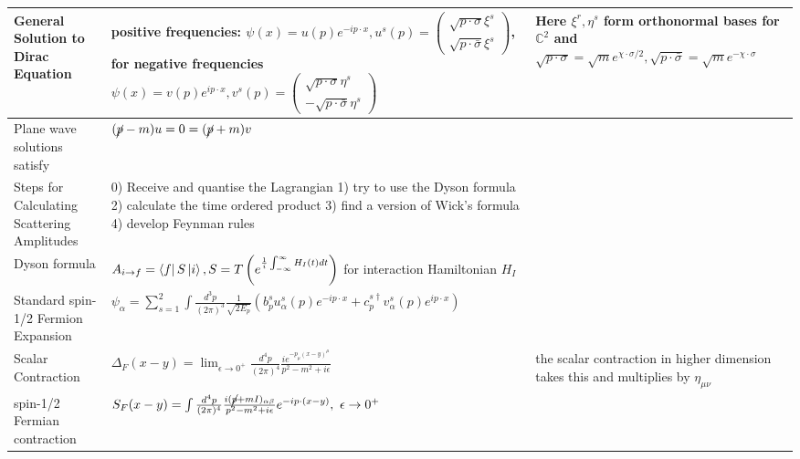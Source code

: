 \documentclass{article}
\theoremstyle{definition}
\begin{document}
\begin{table}[H]
\begin{adjustbox}{center}
\begin{tabular}{|p{5cm}|p{10cm}|p{5cm}|}
      General Solution to Dirac Equation &
      positive frequencies: $\psi(x) = u(p) e^{-i p \cdot x}, u^s(p) = \begin{pmatrix} \sqrt{p \cdot \sigma} \xi^s \\ \sqrt{p \cdot \bar{\sigma}} \xi^s \end{pmatrix}$,
      for negative frequencies $\psi(x) = v(p) e^{ip \cdot x}, v^s(p) = \begin{pmatrix} \sqrt{p \cdot \sigma} \eta^s \\ -\sqrt{p \cdot \bar{\sigma}} \eta^s \end{pmatrix}$ &
      Here $\xi^r, \eta^s$ form orthonormal bases for $\mathbb{C}^2$ and
      $\sqrt{p \cdot \sigma} = \sqrt{m} e^{\chi \cdot \sigma / 2}, \sqrt{p \cdot \bar{\sigma}} = \sqrt{m} e^{-\chi \cdot \sigma}$ \\ \hline
      Plane wave solutions satisfy & $(\cancel{p} - m)u = 0 = (\cancel{p} + m)v$ & \\ \hline
      Steps for Calculating Scattering Amplitudes & 0) Receive and quantise the Lagrangian 1) try to use the Dyson formula 2) calculate the time ordered product 3) find a version of Wick's formula 4) develop Feynman rules & \\ \hline
      Dyson formula & $A_{i \to f} = \bra{f} S \ket{i}, S = T\left( e^{\frac{1}{i} \int_{-\infty}^\infty H_I(t) dt} \right)$ for interaction Hamiltonian $H_I$ & \\ \hline
      Standard spin-1/2 Fermion Expansion & $\psi_\alpha = \sum_{s = 1}^2 \int \frac{d^3p}{(2\pi)^3}
                                            \frac{1}{\sqrt{2 E_p}} \left( b_p^s u_\alpha^s(p) e^{-ip \cdot x} +
                                            c_p^{s \dagger} v_\alpha^s(p) e^{ip \cdot x} \right)$ & \\ \hline
      Scalar Contraction & $ \Delta_F(x - y) = \lim_{\epsilon \to 0^+}
                           \frac{d^4p}{(2\pi)^4} \frac{i e^{-p_\mu (x - y)^\mu}}{p^2 - m^2 + i\epsilon}$
                                  & the scalar contraction in higher dimension takes this and multiplies
                                    by $\eta_{\mu \nu}$ \\ \hline
      spin-1/2 Fermian contraction & $S_F(x - y) = \int \frac{d^4p}{(2\pi)^4} \frac{i(\cancel{p} + mI)_{\alpha \beta}}{p^2 - m^2
  + i \epsilon} e^{-ip \cdot (x - y)}, \ \epsilon \to 0^+$ & \\ \hline
    \end{tabular}
  \end{adjustbox}
\end{table}
\end{document}
